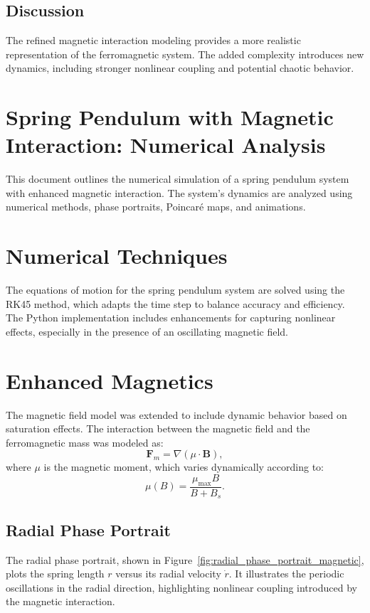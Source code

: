 \documentclass[12pt]{article}
\begin{document}
\subsection{Discussion}
The refined magnetic interaction modeling provides a more realistic representation of the ferromagnetic system. The added complexity introduces new dynamics, including stronger nonlinear coupling and potential chaotic behavior.


\section{Spring Pendulum with Magnetic Interaction: Numerical Analysis}
This document outlines the numerical simulation of a spring pendulum system with enhanced magnetic interaction. The system's dynamics are analyzed using numerical methods, phase portraits, Poincaré maps, and animations.

\section{Numerical Techniques}
The equations of motion for the spring pendulum system are solved using the RK45 method, which adapts the time step to balance accuracy and efficiency. The Python implementation includes enhancements for capturing nonlinear effects, especially in the presence of an oscillating magnetic field.

\section{Enhanced Magnetics}
The magnetic field model was extended to include dynamic behavior based on saturation effects. The interaction between the magnetic field and the ferromagnetic mass was modeled as:
\[
\mathbf{F}_m = \nabla (\mu \cdot \mathbf{B}),
\]
where \( \mu \) is the magnetic moment, which varies dynamically according to:
\[
\mu(B) = \frac{\mu_{\text{max}} B}{B + B_s}.
\]

\subsection{Radial Phase Portrait}
The radial phase portrait, shown in Figure~\ref{fig:radial_phase_portrait_magnetic}, plots the spring length \( r \) versus its radial velocity \( \dot{r} \). It illustrates the periodic oscillations in the radial direction, highlighting nonlinear coupling introduced by the magnetic interaction.
\end{document}
